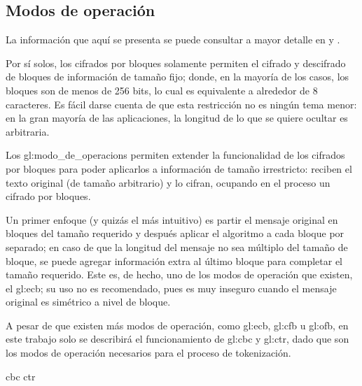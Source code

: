 %
%

\subsection{Modos de operación}
\label{sec:modos}

La información que aquí se presenta se puede consultar a mayor detalle en
\cite{modos_de_operacion} y \cite{menezes}.

Por sí solos, los cifrados por bloques solamente permiten el cifrado y
descifrado de bloques de información de tamaño fijo; donde, en la mayoría de
los casos, los bloques son de menos de 256 bits, lo cual es equivalente a
alrededor de 8 caracteres. Es fácil darse cuenta de que esta restricción no es
ningún tema menor: en la gran mayoría de las aplicaciones, la longitud de lo
que se quiere ocultar es arbitraria.

Los \glspl{gl:modo_de_operacion} permiten extender la funcionalidad de los
cifrados por bloques para poder aplicarlos a información de tamaño irrestricto:
reciben el texto original (de tamaño arbitrario) y lo cifran, ocupando en el
proceso un cifrado por bloques.

Un primer enfoque (y quizás el más intuitivo) es partir el mensaje original
en bloques del tamaño requerido y después aplicar el algoritmo a cada bloque
por separado; en caso de que la longitud del mensaje no sea múltiplo del
tamaño de bloque, se puede agregar información extra al último bloque para
completar el tamaño requerido. Este es, de hecho, uno de los modos de operación
que existen, el \gls{gl:ecb}; su uso no es recomendado, pues es muy inseguro
cuando el mensaje original es simétrico a nivel de bloque.

A pesar de que existen más modos de operación, como \gls{gl:ecb}, \gls{gl:cfb}
u \gls{gl:ofb}, en este trabajo solo se describirá el funcionamiento de
\gls{gl:cbc} y \gls{gl:ctr}, dado que son los modos de operación necesarios
para el proceso de tokenización.



{cbc}
{ctr}
